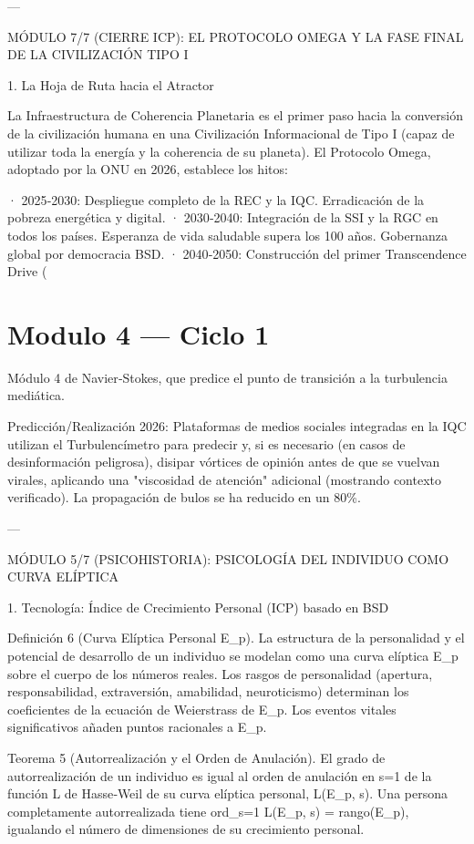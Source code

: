 \documentclass[12pt,twoside]{book}
\begin{document}
---

MÓDULO 7/7 (CIERRE ICP): EL PROTOCOLO OMEGA Y LA FASE FINAL DE LA CIVILIZACIÓN TIPO I

1. La Hoja de Ruta hacia el Atractor

La Infraestructura de Coherencia Planetaria es el primer paso hacia la conversión de la civilización humana en una Civilización Informacional de Tipo I (capaz de utilizar toda la energía y la coherencia de su planeta). El Protocolo Omega, adoptado por la ONU en 2026, establece los hitos:

· 2025‑2030: Despliegue completo de la REC y la IQC. Erradicación de la pobreza energética y digital.
· 2030‑2040: Integración de la SSI y la RGC en todos los países. Esperanza de vida saludable supera los 100 años. Gobernanza global por democracia BSD.
· 2040‑2050: Construcción del primer Transcendence Drive (

\chapter{Modulo 4 — Ciclo 1}
Módulo 4 de Navier‑Stokes, que predice el punto de transición a la turbulencia mediática.

Predicción/Realización 2026: Plataformas de medios sociales integradas en la IQC utilizan el Turbulencímetro para predecir y, si es necesario (en casos de desinformación peligrosa), disipar vórtices de opinión antes de que se vuelvan virales, aplicando una "viscosidad de atención" adicional (mostrando contexto verificado). La propagación de bulos se ha reducido en un 80\%.

---

MÓDULO 5/7 (PSICOHISTORIA): PSICOLOGÍA DEL INDIVIDUO COMO CURVA ELÍPTICA

1. Tecnología: Índice de Crecimiento Personal (ICP) basado en BSD

Definición 6 (Curva Elíptica Personal E_p). La estructura de la personalidad y el potencial de desarrollo de un individuo se modelan como una curva elíptica E_p sobre el cuerpo de los números reales. Los rasgos de personalidad (apertura, responsabilidad, extraversión, amabilidad, neuroticismo) determinan los coeficientes de la ecuación de Weierstrass de E_p. Los eventos vitales significativos añaden puntos racionales a E_p.

Teorema 5 (Autorrealización y el Orden de Anulación). El grado de autorrealización de un individuo es igual al orden de anulación en s=1 de la función L de Hasse‑Weil de su curva elíptica personal, L(E_p, s). Una persona completamente autorrealizada tiene ord_{s=1} L(E_p, s) = rango(E_p), igualando el número de dimensiones de su crecimiento personal.
\end{document}
